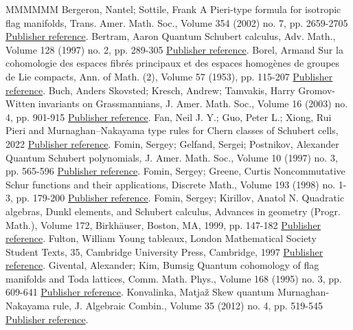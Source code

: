 \documentclass[11pt]{article}
\theoremstyle{definition}
\numberwithin{equation}{section}
\begin{document}
\begin{thebibliography}{MMMMMM}
 Bergeron, Nantel; Sottile, Frank A Pieri-type formula for isotropic flag manifolds, Trans. Amer. Math. Soc., Volume 354 (2002) no. 7, pp. 2659-2705 \href{https://alco.centre-mersenne.org/articles/10.5802/alco.427/#BS-iso}{Publisher reference}.
 Bertram, Aaron Quantum Schubert calculus, Adv. Math., Volume 128 (1997) no. 2, pp. 289-305 \href{https://alco.centre-mersenne.org/articles/10.5802/alco.427/#Bertram}{Publisher reference}.
 Borel, Armand Sur la cohomologie des espaces fibrés principaux et des espaces homogènes de groupes de Lie compacts, Ann. of Math. (2), Volume 57 (1953), pp. 115-207 \href{https://alco.centre-mersenne.org/articles/10.5802/alco.427/#Borel}{Publisher reference}.
 Buch, Anders Skovsted; Kresch, Andrew; Tamvakis, Harry Gromov-Witten invariants on Grassmannians, J. Amer. Math. Soc., Volume 16 (2003) no. 4, pp. 901-915 \href{https://alco.centre-mersenne.org/articles/10.5802/alco.427/#BKT}{Publisher reference}.
 Fan, Neil J. Y.; Guo, Peter L.; Xiong, Rui Pieri and Murnaghan–Nakayama type rules for Chern classes of Schubert cells, 2022 \href{https://alco.centre-mersenne.org/articles/10.5802/alco.427/#FGX}{Publisher reference}.
 Fomin, Sergey; Gelfand, Sergei; Postnikov, Alexander Quantum Schubert polynomials, J. Amer. Math. Soc., Volume 10 (1997) no. 3, pp. 565-596 \href{https://alco.centre-mersenne.org/articles/10.5802/alco.427/#FGP}{Publisher reference}.
 Fomin, Sergey; Greene, Curtis Noncommutative Schur functions and their applications, Discrete Math., Volume 193 (1998) no. 1-3, pp. 179-200 \href{https://alco.centre-mersenne.org/articles/10.5802/alco.427/#FoGr98}{Publisher reference}.
 Fomin, Sergey; Kirillov, Anatol N. Quadratic algebras, Dunkl elements, and Schubert calculus, Advances in geometry (Progr. Math.), Volume 172, Birkhäuser, Boston, MA, 1999, pp. 147-182 \href{https://alco.centre-mersenne.org/articles/10.5802/alco.427/#FominKirillov}{Publisher reference}.
 Fulton, William Young tableaux, London Mathematical Society Student Texts, 35, Cambridge University Press, Cambridge, 1997 \href{https://alco.centre-mersenne.org/articles/10.5802/alco.427/#Fu97}{Publisher reference}.
 Givental, Alexander; Kim, Bumsig Quantum cohomology of flag manifolds and Toda lattices, Comm. Math. Phys., Volume 168 (1995) no. 3, pp. 609-641 \href{https://alco.centre-mersenne.org/articles/10.5802/alco.427/#GiventalKim}{Publisher reference}.
 Konvalinka, Matjaž Skew quantum Murnaghan-Nakayama rule, J. Algebraic Combin., Volume 35 (2012) no. 4, pp. 519-545 \href{https://alco.centre-mersenne.org/articles/10.5802/alco.427/#Ko12}{Publisher reference}.

\end{thebibliography}
\end{document}
